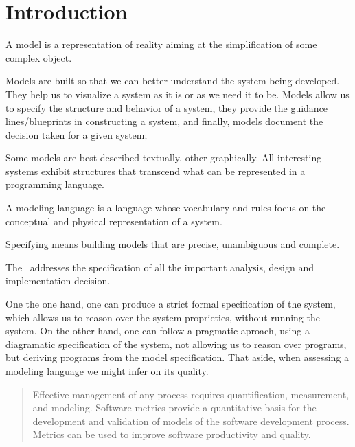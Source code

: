 \section{Introduction}

\indent
\par A model is a representation of reality aiming at the simplification of some complex object.

\par Models are built so that we can better understand the system being developed.
They help us to visualize a system as it is or as we need it to be. Models allow us to specify the structure and behavior of a system, they provide the guidance lines/blueprints in constructing a system, and finally, models document the decision taken for a given system;


\par Some models are best described textually, other graphically. All interesting systems exhibit structures that transcend what can be represented in a programming language.


\par A modeling language is a language whose vocabulary and rules focus on the conceptual and physical representation of a system.%

\par Specifying means building models that are precise, unambiguous and complete. 

The \umlS~addresses the specification of all the important analysis, design and implementation decision. %

\par One the one hand, one can produce a strict formal specification of the system, which allows us to reason over the system proprieties, without running the system.
On the other hand, one can follow a pragmatic aproach, using a diagramatic specification of the system, not allowing us to reason over programs,
but deriving programs from the model specification. That aside, when assessing a modeling language we might infer on its quality.
\begin{quotation}
Effective management of any process requires quantification, measurement, and modeling.
Software metrics provide a quantitative basis for the development and validation of models of the software development process.
Metrics can be used to improve software productivity and quality\cite{g1:Millis:1998}.
\end{quotation}

